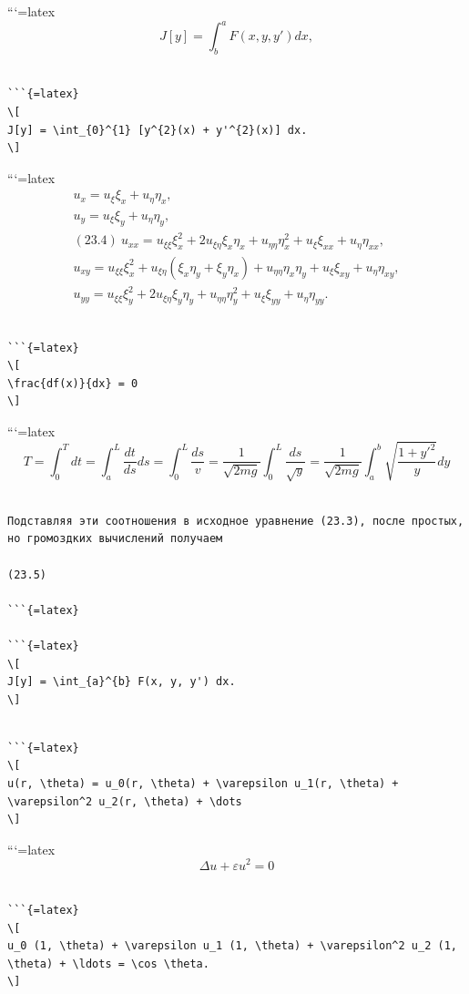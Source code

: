 \documentclass[
]{article}
\begin{document}
```{=latex}
\[
J[y] = \int_{b}^{a} F(x, y, y') dx,
\]

\begin{verbatim}

```{=latex}
\[
J[y] = \int_{0}^{1} [y^{2}(x) + y'^{2}(x)] dx.
\]
\end{verbatim}

```{=latex}
\[
\begin{aligned} u_x = u_\xi \xi_x + u_\eta \eta_x, \\ u_y = u_\xi \xi_y + u_\eta \eta_y, \\ (23.4) \ u_{xx} = u_{\xi\xi} \xi_x^2 + 2u_{\xi\eta} \xi_x \eta_x + u_{\eta\eta} \eta_x^2 + u_{\xi} \xi_{xx} + u_{\eta} \eta_{xx}, \\ u_{xy} = u_{\xi\xi} \xi_x^2 + u_{\xi\eta} (\xi_x \eta_y + \xi_y \eta_x) + u_{\eta\eta} \eta_x \eta_y + u_{\xi} \xi_{xy} + u_{\eta} \eta_{xy}, \\ u_{yy} = u_{\xi\xi} \xi_y^2 + 2u_{\xi\eta} \xi_y \eta_y + u_{\eta\eta} \eta_y^2 + u_{\xi} \xi_{yy} + u_{\eta} \eta_{yy}. \end{aligned}
\]

\begin{verbatim}

```{=latex}
\[
\frac{df(x)}{dx} = 0
\]
\end{verbatim}

```{=latex}
\[
T = \int_{0}^{T} dt = \int_{a}^{L} \frac{dt}{ds} ds = \int_{0}^{L} \frac{ds}{v} = \frac{1}{\sqrt{2mg}} \int_{0}^{L} \frac{ds}{\sqrt{y}} = \frac{1}{\sqrt{2mg}} \int_{a}^{b} \sqrt{\frac{1+y'^{2}}{y}} dy
\]

\begin{verbatim}

Подставляя эти соотношения в исходное уравнение (23.3), после простых, но громоздких вычислений получаем

(23.5)

```{=latex}

```{=latex}
\[
J[y] = \int_{a}^{b} F(x, y, y') dx.
\]
\end{verbatim}

\begin{verbatim}

```{=latex}
\[
u(r, \theta) = u_0(r, \theta) + \varepsilon u_1(r, \theta) + \varepsilon^2 u_2(r, \theta) + \dots
\]
\end{verbatim}

```{=latex}
\[
\Delta u + \varepsilon u^2 = 0
\]

\begin{verbatim}

```{=latex}
\[
u_0 (1, \theta) + \varepsilon u_1 (1, \theta) + \varepsilon^2 u_2 (1, \theta) + \ldots = \cos \theta.
\]
\end{verbatim}
\end{document}
